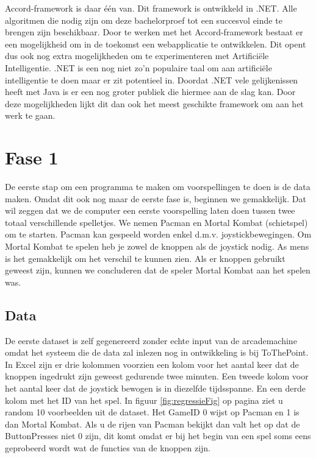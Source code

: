 Accord-framework is daar één van. Dit framework is ontwikkeld in .NET. Alle algoritmen die nodig zijn om deze bachelorproef tot een succesvol einde te brengen zijn beschikbaar. \newline
Door te werken met het Accord-framework bestaat er een mogelijkheid om in de toekomst een webapplicatie te ontwikkelen. Dit opent dus ook nog extra mogelijkheden om te experimenteren met Artificiële Intelligentie. 
\newline
.NET is een nog niet zo'n populaire taal om aan artificiële intelligentie te doen maar er zit potentieel in. Doordat .NET vele gelijkenissen heeft met Java is er een nog groter publiek die hiermee aan de slag kan.
\newline
Door deze mogelijkheden lijkt dit dan ook het meest geschikte framework om aan het werk te gaan. 

\section{Fase 1}
\label{sec:Fase1}
De eerste stap om een programma te maken om voorspellingen te doen is de data maken. Omdat dit ook nog maar de eerste fase is, beginnen we gemakkelijk. Dat wil zeggen dat we de computer een eerste voorspelling laten doen tussen twee totaal verschillende spelletjes. We nemen Pacman en Mortal Kombat (schietspel) om te starten. Pacman kan gespeeld worden enkel d.m.v. joystickbewegingen. Om Mortal Kombat te spelen heb je zowel de knoppen als de joystick nodig.  As mens is het gemakkelijk om het verschil te kunnen zien. Als er knoppen gebruikt geweest zijn, kunnen we concluderen dat de speler Mortal Kombat aan het spelen was. 

\subsection{Data}
\label{sec:DataFase1}
De eerste dataset is zelf gegenereerd zonder echte input van de arcademachine omdat het systeem die de data zal inlezen nog in ontwikkeling is bij ToThePoint. 
In Excel zijn er drie kolommen voorzien een kolom voor het aantal keer dat de knoppen ingedrukt zijn geweest gedurende twee minuten. Een tweede kolom voor het aantal keer dat de joystick bewogen is in diezelfde tijdsspanne. En een derde kolom met het ID van het spel. 
In figuur \ref{fig:regressieFig} op pagina \pageref{fig:regressieFig} ziet u random 10 voorbeelden uit de dataset.
Het GameID 0 wijst op Pacman en 1 is dan Mortal Kombat. Als u de rijen van Pacman bekijkt dan valt het op dat de ButtonPresses niet 0 zijn, dit komt omdat er bij het begin van een spel soms eens geprobeerd wordt wat de functies van de knoppen zijn. 

